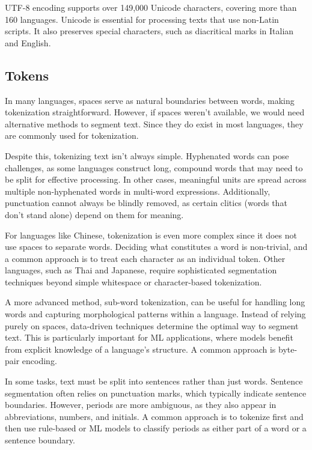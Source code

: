 UTF-8 encoding supports over 149,000 Unicode characters, covering more than 160 languages. 
Unicode is essential for processing texts that use non-Latin scripts. 
It also preserves special characters, such as diacritical marks in Italian and English.

\subsection{Tokens}
In many languages, spaces serve as natural boundaries between words, making tokenization straightforward. 
However, if spaces weren't available, we would need alternative methods to segment text. 
Since they do exist in most languages, they are commonly used for tokenization.

Despite this, tokenizing text isn't always simple. 
Hyphenated words can pose challenges, as some languages construct long, compound words that may need to be split for effective processing. 
In other cases, meaningful units are spread across multiple non-hyphenated words in multi-word expressions. 
Additionally, punctuation cannot always be blindly removed, as certain clitics (words that don't stand alone) depend on them for meaning.

For languages like Chinese, tokenization is even more complex since it does not use spaces to separate words.
Deciding what constitutes a word is non-trivial, and a common approach is to treat each character as an individual token.
Other languages, such as Thai and Japanese, require sophisticated segmentation techniques beyond simple whitespace or character-based tokenization.

A more advanced method, sub-word tokenization, can be useful for handling long words and capturing morphological patterns within a language. 
Instead of relying purely on spaces, data-driven techniques determine the optimal way to segment text. 
This is particularly important for ML applications, where models benefit from explicit knowledge of a language's structure. 
A common approach is byte-pair encoding.

In some tasks, text must be split into sentences rather than just words. 
Sentence segmentation often relies on punctuation marks, which typically indicate sentence boundaries.
However, periods are more ambiguous, as they also appear in abbreviations, numbers, and initials. 
A common approach is to tokenize first and then use rule-based or ML models to classify periods as either part of a word or a sentence boundary.

